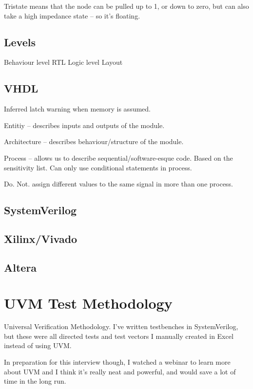 \documentclass{IEEEtran}
\begin{document}
Tristate means that the node can be pulled up to 1, or down to zero, but can also take a high impedance state -- so it's floating.

\subsection{Levels}

Behaviour level
RTL
Logic level
Layout 

\subsection{VHDL}

Inferred latch warning when memory is assumed.

Entitiy -- describes inputs and outputs of the module.

Architecture -- describes behaviour/structure of the module.

Process -- allows us to describe sequential/software-esque code. Based on the sensitivity list. Can only use conditional statements in process. 

Do. Not. assign different values to the same signal in more than one process.

\subsection{SystemVerilog}

\subsection{Xilinx/Vivado}

\subsection{Altera}

\section{UVM Test Methodology}

Universal Verification Methodology. I've written testbenches in SystemVerilog, but these were all directed tests and test vectors I manually created in Excel instead of using UVM. 

In preparation for this interview though, I watched a webinar to learn more about UVM and I think it's really neat and powerful, and would save a lot of time in the long run. 
\end{document}
